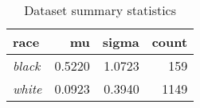 \begin{table}[H]

\caption{\label{tab:dataset_summary}Dataset summary statistics}
\centering
\begin{tabular}[t]{>{}l|r|r|r}
\hline
race & mu & sigma & count\\
\hline
\hline
\em{black} & 0.5220 & 1.0723 & 159\\
\hline
\em{white} & 0.0923 & 0.3940 & 1149\\
\hline
\end{tabular}
\end{table}